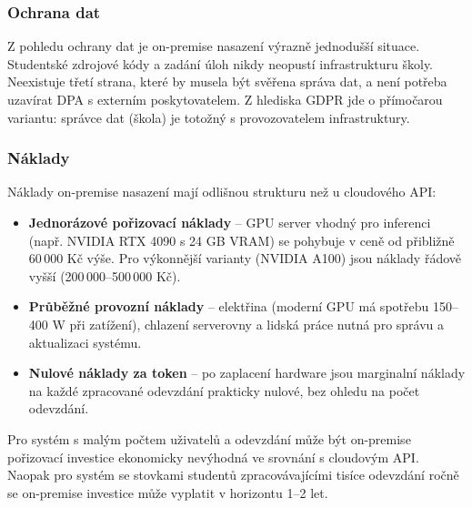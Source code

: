 \subsubsection*{Ochrana dat}

Z pohledu ochrany dat je on-premise nasazení výrazně jednodušší situace.
Studentské zdrojové kódy a zadání úloh nikdy neopustí infrastrukturu školy.
Neexistuje třetí strana, které by musela být svěřena správa dat, a není potřeba uzavírat DPA s externím poskytovatelem.
Z hlediska GDPR jde o přímočarou variantu: správce dat (škola) je totožný s provozovatelem infrastruktury.

\subsubsection*{Náklady}

Náklady on-premise nasazení mají odlišnou strukturu než u cloudového API:

\begin{itemize}
    \item \textbf{Jednorázové pořizovací náklady} -- GPU server vhodný pro inferenci (např. NVIDIA RTX 4090 s 24 GB VRAM) se pohybuje v ceně od přibližně 60\,000 Kč výše.
    Pro výkonnější varianty (NVIDIA A100) jsou náklady řádově vyšší (200\,000--500\,000 Kč).

    \item \textbf{Průběžné provozní náklady} -- elektřina (moderní GPU má spotřebu 150--400 W při zatížení), chlazení serverovny a lidská práce nutná pro správu a aktualizaci systému.

    \item \textbf{Nulové náklady za token} -- po zaplacení hardware jsou marginalní náklady na každé zpracované odevzdání prakticky nulové, bez ohledu na počet odevzdání.
\end{itemize}

Pro systém s malým počtem uživatelů a odevzdání může být on-premise pořizovací investice ekonomicky nevýhodná ve srovnání s cloudovým API.
Naopak pro systém se stovkami studentů zpracovávajícími tisíce odevzdání ročně se on-premise investice může vyplatit v horizontu 1--2 let.

